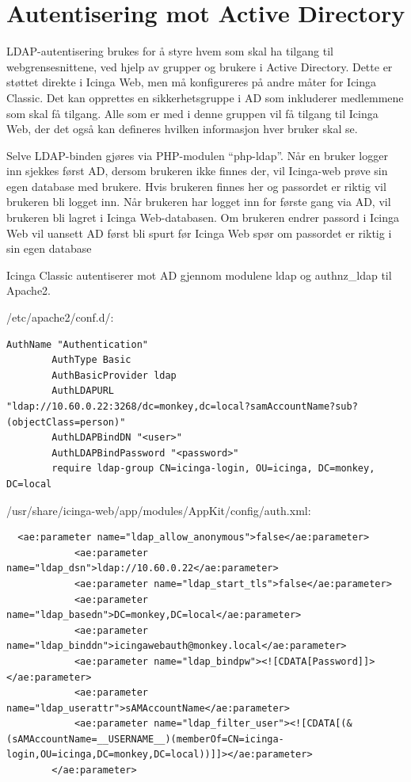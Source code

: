 \section{Autentisering mot Active Directory} 
LDAP-autentisering brukes for å styre hvem som skal ha tilgang til webgrensesnittene, ved hjelp av grupper og brukere i Active Directory. Dette er støttet direkte i Icinga Web, men må konfigureres på andre måter for Icinga Classic. Det kan opprettes en sikkerhetsgruppe i AD som inkluderer medlemmene som skal få tilgang. Alle som er med i denne gruppen vil få tilgang til Icinga Web, der det også kan defineres hvilken informasjon hver bruker skal se. 

Selve LDAP-binden gjøres via PHP-modulen ``php-ldap''. Når en bruker logger inn sjekkes først AD, dersom brukeren ikke finnes der, vil Icinga-web prøve sin egen database med brukere. Hvis brukeren finnes her og passordet er riktig vil brukeren bli logget inn. Når brukeren har logget inn for første gang via AD, vil brukeren bli lagret i Icinga Web-databasen. Om brukeren endrer passord i Icinga Web vil uansett AD først bli spurt før Icinga Web spør om passordet er riktig i sin egen database

Icinga Classic autentiserer mot AD gjennom modulene ldap og authnz\_ldap til Apache2.

/etc/apache2/conf.d/:
\begin{lstlisting}[style=example]
        AuthName "Authentication"
        AuthType Basic
        AuthBasicProvider ldap
        AuthLDAPURL
"ldap://10.60.0.22:3268/dc=monkey,dc=local?samAccountName?sub?(objectClass=person)"
        AuthLDAPBindDN "<user>"
        AuthLDAPBindPassword "<password>"
        require ldap-group CN=icinga-login, OU=icinga, DC=monkey, DC=local
\end{lstlisting}

/usr/share/icinga-web/app/modules/AppKit/config/auth.xml:
\begin{lstlisting}
  <ae:parameter name="ldap_allow_anonymous">false</ae:parameter>
            <ae:parameter name="ldap_dsn">ldap://10.60.0.22</ae:parameter>
            <ae:parameter name="ldap_start_tls">false</ae:parameter>
            <ae:parameter name="ldap_basedn">DC=monkey,DC=local</ae:parameter>
            <ae:parameter name="ldap_binddn">icingawebauth@monkey.local</ae:parameter>
            <ae:parameter name="ldap_bindpw"><![CDATA[Password]]></ae:parameter>
            <ae:parameter name="ldap_userattr">sAMAccountName</ae:parameter>
            <ae:parameter name="ldap_filter_user"><![CDATA[(&(sAMAccountName=__USERNAME__)(memberOf=CN=icinga-login,OU=icinga,DC=monkey,DC=local))]]></ae:parameter>
        </ae:parameter>
\end{lstlisting}

